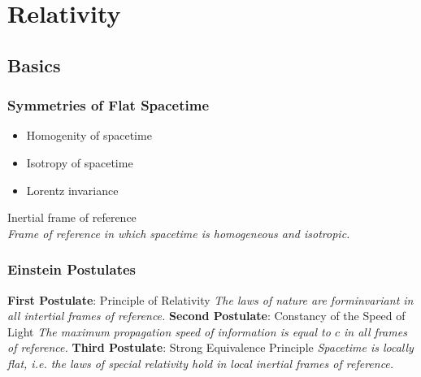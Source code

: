 \section{Relativity}
	\subsection{Basics}
		\subsubsection{Symmetries of Flat Spacetime}
			\begin{itemize}
				\item Homogenity of spacetime
				\item Isotropy of spacetime
				\item Lorentz invariance
			\end{itemize}

			\noindent
			Inertial frame of reference \\
				\indent \textit{Frame of reference in which spacetime is homogeneous and isotropic.}

		\subsubsection{Einstein Postulates}
			\textbf{First Postulate}: Principle of Relativity \newline
				\indent \textit{The laws of nature are forminvariant in all intertial frames of reference.}  \nl
			\textbf{Second Postulate}: Constancy of the Speed of Light \newline
				\indent \textit{The maximum propagation speed of information is equal to $c$ in all frames of reference.}
				\label{post:c}\nl
			\textbf{Third Postulate}: Strong Equivalence Principle \newline
				\indent \textit{Spacetime is locally flat, i.e. the laws of special relativity hold in local inertial frames of reference.}  \vsp


